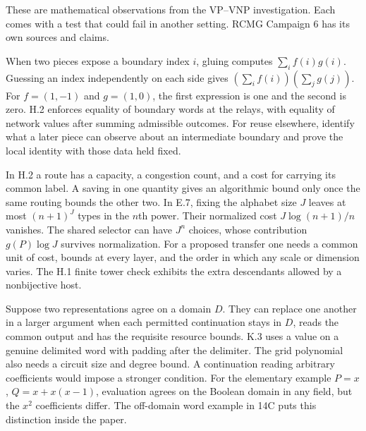 \clearpage
{}\label{sec:14transfer}
These are mathematical observations from the VP--VNP investigation. Each comes with a test that could fail in another setting. RCMG Campaign 6 has its own sources and claims.

When two pieces expose a boundary index $i$, gluing computes $\sum_i f(i)g(i)$. Guessing an index independently on each side gives $(\sum_i f(i))(\sum_jg(j))$. For $f=(1,-1)$ and $g=(1,0)$, the first expression is one and the second is zero. H.2 enforces equality of boundary words at the relays, with equality of network values after summing admissible outcomes. For reuse elsewhere, identify what a later piece can observe about an intermediate boundary and prove the local identity with those data held fixed.

In H.2 a route has a capacity, a congestion count, and a cost for carrying its common label. A saving in one quantity gives an algorithmic bound only once the same routing bounds the other two. In E.7, fixing the alphabet size $J$ leaves at most $(n+1)^J$ types in the $n$th power. Their normalized cost $J\log(n+1)/n$ vanishes. The shared selector can have $J^n$ choices, whose contribution $g(P)\log J$ survives normalization. For a proposed transfer one needs a common unit of cost, bounds at every layer, and the order in which any scale or dimension varies. The H.1 finite tower check exhibits the extra descendants allowed by a nonbijective host.

Suppose two representations agree on a domain $D$. They can replace one another in a larger argument when each permitted continuation stays in $D$, reads the common output and has the requisite resource bounds. K.3 uses a value on a genuine delimited word with padding after the delimiter. The grid polynomial also needs a circuit size and degree bound. A continuation reading arbitrary coefficients would impose a stronger condition. For the elementary example $P=x$, $Q=x+x(x-1)$, evaluation agrees on the Boolean domain in any field, but the $x^2$ coefficients differ. The off-domain word example in 14C puts this distinction inside the paper.

